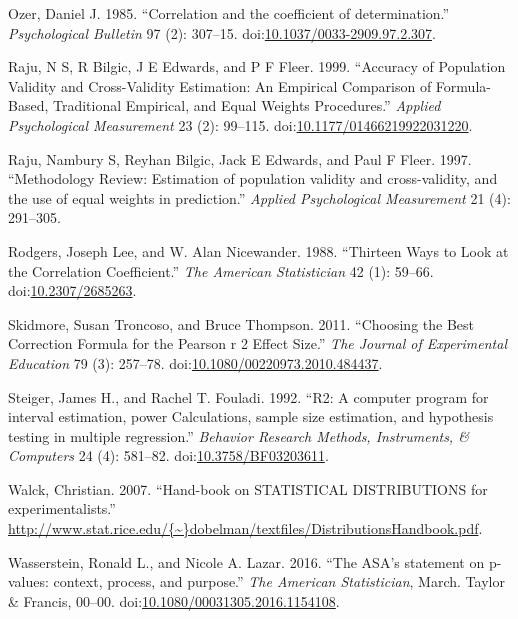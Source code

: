 \documentclass[]{article}
\begin{document}
\hypertarget{ref-Ozer1985}{}
Ozer, Daniel J. 1985. ``Correlation and the coefficient of
determination.'' \emph{Psychological Bulletin} 97 (2): 307--15.
doi:\href{https://doi.org/10.1037/0033-2909.97.2.307}{10.1037/0033-2909.97.2.307}.

\hypertarget{ref-Raju1999}{}
Raju, N S, R Bilgic, J E Edwards, and P F Fleer. 1999. ``Accuracy of
Population Validity and Cross-Validity Estimation: An Empirical
Comparison of Formula-Based, Traditional Empirical, and Equal Weights
Procedures.'' \emph{Applied Psychological Measurement} 23 (2): 99--115.
doi:\href{https://doi.org/10.1177/01466219922031220}{10.1177/01466219922031220}.

\hypertarget{ref-Raju1997}{}
Raju, Nambury S, Reyhan Bilgic, Jack E Edwards, and Paul F Fleer. 1997.
``Methodology Review: Estimation of population validity and
cross-validity, and the use of equal weights in prediction.''
\emph{Applied Psychological Measurement} 21 (4): 291--305.

\hypertarget{ref-Rodgers1988}{}
Rodgers, Joseph Lee, and W. Alan Nicewander. 1988. ``Thirteen Ways to
Look at the Correlation Coefficient.'' \emph{The American Statistician}
42 (1): 59--66.
doi:\href{https://doi.org/10.2307/2685263}{10.2307/2685263}.

\hypertarget{ref-Skidmore2011}{}
Skidmore, Susan Troncoso, and Bruce Thompson. 2011. ``Choosing the Best
Correction Formula for the Pearson r 2 Effect Size.'' \emph{The Journal
of Experimental Education} 79 (3): 257--78.
doi:\href{https://doi.org/10.1080/00220973.2010.484437}{10.1080/00220973.2010.484437}.

\hypertarget{ref-Steiger1992}{}
Steiger, James H., and Rachel T. Fouladi. 1992. ``R2: A computer program
for interval estimation, power Calculations, sample size estimation, and
hypothesis testing in multiple regression.'' \emph{Behavior Research
Methods, Instruments, \& Computers} 24 (4): 581--82.
doi:\href{https://doi.org/10.3758/BF03203611}{10.3758/BF03203611}.

\hypertarget{ref-Walck2007}{}
Walck, Christian. 2007. ``Hand-book on STATISTICAL DISTRIBUTIONS for
experimentalists.''
\href{http://www.stat.rice.edu/\%7B~\%7Ddobelman/textfiles/DistributionsHandbook.pdf}{http://www.stat.rice.edu/\{\textasciitilde{}\}dobelman/textfiles/DistributionsHandbook.pdf}.

\hypertarget{ref-Wasserstein2016}{}
Wasserstein, Ronald L., and Nicole A. Lazar. 2016. ``The ASA's statement
on p-values: context, process, and purpose.'' \emph{The American
Statistician}, March. Taylor \& Francis, 00--00.
doi:\href{https://doi.org/10.1080/00031305.2016.1154108}{10.1080/00031305.2016.1154108}.
\end{document}
